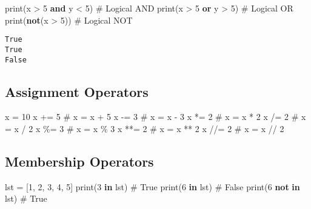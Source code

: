 \documentclass[
  letterpaper,
  DIV=11,
  numbers=noendperiod]{scrreprt}
\newenvironment{Shaded}{\begin{snugshade}}{\end{snugshade}}
\newcommand{\BuiltInTok}[1]{\textcolor[rgb]{0.00,0.23,0.31}{#1}}
\newcommand{\CommentTok}[1]{\textcolor[rgb]{0.37,0.37,0.37}{#1}}
\newcommand{\DecValTok}[1]{\textcolor[rgb]{0.68,0.00,0.00}{#1}}
\newcommand{\KeywordTok}[1]{\textcolor[rgb]{0.00,0.23,0.31}{\textbf{#1}}}
\newcommand{\NormalTok}[1]{\textcolor[rgb]{0.00,0.23,0.31}{#1}}
\newcommand{\OperatorTok}[1]{\textcolor[rgb]{0.37,0.37,0.37}{#1}}
\begin{document}
\begin{Shaded}
\begin{Highlighting}[]
\BuiltInTok{print}\NormalTok{(x }\OperatorTok{\textgreater{}} \DecValTok{5} \KeywordTok{and}\NormalTok{ y }\OperatorTok{\textless{}} \DecValTok{5}\NormalTok{)  }\CommentTok{\# Logical AND}
\BuiltInTok{print}\NormalTok{(x }\OperatorTok{\textgreater{}} \DecValTok{5} \KeywordTok{or}\NormalTok{ y }\OperatorTok{\textgreater{}} \DecValTok{5}\NormalTok{)   }\CommentTok{\# Logical OR}
\BuiltInTok{print}\NormalTok{(}\KeywordTok{not}\NormalTok{(x }\OperatorTok{\textgreater{}} \DecValTok{5}\NormalTok{))       }\CommentTok{\# Logical NOT}
\end{Highlighting}
\end{Shaded}

\begin{verbatim}
True
True
False
\end{verbatim}

\subsection{Assignment Operators}\label{assignment-operators}

\begin{Shaded}
\begin{Highlighting}[]
\NormalTok{x }\OperatorTok{=} \DecValTok{10}
\NormalTok{x }\OperatorTok{+=} \DecValTok{5}  \CommentTok{\# x = x + 5}
\NormalTok{x }\OperatorTok{{-}=} \DecValTok{3}  \CommentTok{\# x = x {-} 3}
\NormalTok{x }\OperatorTok{*=} \DecValTok{2}  \CommentTok{\# x = x * 2}
\NormalTok{x }\OperatorTok{/=} \DecValTok{2}  \CommentTok{\# x = x / 2}
\NormalTok{x }\OperatorTok{\%=} \DecValTok{3}  \CommentTok{\# x = x \% 3}
\NormalTok{x }\OperatorTok{**=} \DecValTok{2} \CommentTok{\# x = x ** 2}
\NormalTok{x }\OperatorTok{//=} \DecValTok{2} \CommentTok{\# x = x // 2}
\end{Highlighting}
\end{Shaded}

\subsection{Membership Operators}\label{membership-operators}

\begin{Shaded}
\begin{Highlighting}[]
\NormalTok{lst }\OperatorTok{=}\NormalTok{ [}\DecValTok{1}\NormalTok{, }\DecValTok{2}\NormalTok{, }\DecValTok{3}\NormalTok{, }\DecValTok{4}\NormalTok{, }\DecValTok{5}\NormalTok{]}
\BuiltInTok{print}\NormalTok{(}\DecValTok{3} \KeywordTok{in}\NormalTok{ lst)  }\CommentTok{\# True}
\BuiltInTok{print}\NormalTok{(}\DecValTok{6} \KeywordTok{in}\NormalTok{ lst)  }\CommentTok{\# False}
\BuiltInTok{print}\NormalTok{(}\DecValTok{6} \KeywordTok{not} \KeywordTok{in}\NormalTok{ lst)  }\CommentTok{\# True}
\end{Highlighting}
\end{Shaded}
\end{document}
